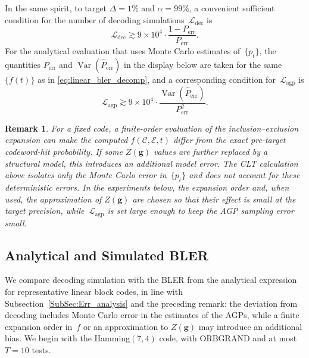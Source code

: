 \documentclass[letterpaper,draftclsnofoot,onecolumn]{IEEEtran}
\newtheorem{remark}{Remark}
\begin{document}
In the same spirit, to target $\Delta = 1\%$ and $\alpha = 99\%$, a convenient sufficient condition for the number of decoding simulations~$\mathcal{L}_{\text{dec}}$ is
\begin{equation}\label{eq:decoding_sample_rule}
\mathcal{L}_{\text{dec}} \gtrsim 9 \times 10^4 \cdot \frac{1 - P_{\text{err}}}{P_{\text{err}}}.
\end{equation}
For the analytical evaluation that uses Monte Carlo estimates of~$\{p_t\}$, the quantities $P_{\text{err}}$ and $\operatorname{Var}(\hat{P}_{\text{err}})$ in the display below are taken for the same $\{f(t)\}$ as in \eqref{eq:linear_bler_decomp}, and a corresponding condition for~$\mathcal{L}_{\text{agp}}$ is
\begin{equation}\label{eq:agp_sample_rule}
\mathcal{L}_{\text{agp}} \gtrsim 9 \times 10^4 \cdot \frac{\operatorname{Var}(\hat{P}_{\text{err}})}{P_{\text{err}}^2}.
\end{equation}

\begin{remark}
For a fixed code, a finite-order evaluation of the inclusion--exclusion expansion can make the computed $f(\mathcal{C}, \mathcal{E}, t)$ differ from the exact pre-target codeword-hit probability. If some $Z(\mathbf{g})$ values are further replaced by a structural model, this introduces an additional model error. The CLT calculation above isolates only the Monte Carlo error in~$\{p_t\}$ and does not account for these deterministic errors. In the experiments below, the expansion order and, when used, the approximation of $Z(\mathbf{g})$ are chosen so that their effect is small at the target precision, while~$\mathcal{L}_{\text{agp}}$ is set large enough to keep the AGP sampling error small.
\end{remark}

\subsection{Analytical and Simulated BLER}\label{SubSec:Simulation1}

We compare decoding simulation with the BLER from the analytical expression for representative linear block codes, in line with Subsection~\ref{SubSec:Err_analysis} and the preceding remark: the deviation from decoding includes Monte Carlo error in the estimates of the AGPs, while a finite expansion order in~$f$ or an approximation to $Z(\mathbf{g})$ may introduce an additional bias. We begin with the Hamming$(7,4)$ code, with ORBGRAND and at most $T = 10$ tests.
\end{document}
